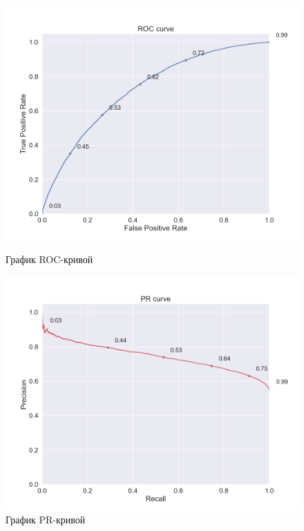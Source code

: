 \begin{figure}[h!]
\centering
\begin{minipage}{.5\textwidth}
\centering
\includegraphics[width=1.1\linewidth]{images/hybrid/roc_curve}
\caption{График ROC-кривой}
\label{fig:hybrid_roc}
\end{minipage}%
\begin{minipage}{.5\textwidth}
\centering
\includegraphics[width=1.1\linewidth]{images/hybrid/pr_curve}
\caption{График PR-кривой}
\label{fig:hybrid_pr}
\end{minipage}
\end{figure}

\pagebreak
